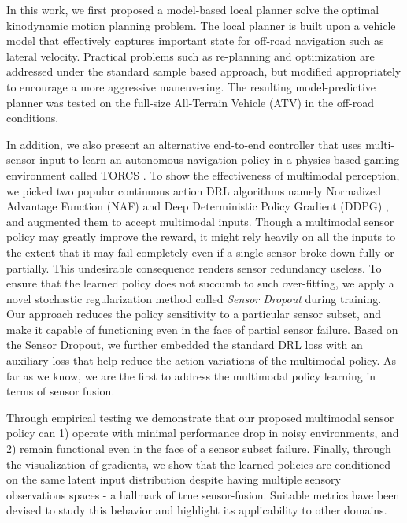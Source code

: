 \documentclass[../thesis.tex]{subfiles}
\begin{document}
In this work, we first proposed a model-based local planner solve the optimal kinodynamic motion planning problem. 
The local planner is built upon a vehicle model that effectively captures important state for off-road navigation such as lateral velocity. 
Practical problems such as re-planning and optimization are addressed under the standard sample based approach, but modified appropriately to encourage a more aggressive maneuvering. 
The resulting model-predictive planner was tested on the full-size All-Terrain Vehicle (ATV) in the off-road conditions.

In addition, we also present an alternative end-to-end controller that uses multi-sensor input to learn an autonomous navigation policy in a physics-based gaming environment called TORCS \cite{wymann2000torcs}. 
To show the effectiveness of multimodal perception, we picked two popular continuous action DRL algorithms namely Normalized Advantage Function (NAF) \cite{CDQN} and Deep Deterministic Policy Gradient (DDPG) \cite{DBLP:journals/corr/LillicrapHPHETS15}, and augmented them to accept multimodal inputs. 
Though a multimodal sensor policy may greatly improve the reward, it might rely heavily on all the inputs to the extent that it may fail completely even if a single sensor broke down fully or partially. This undesirable consequence renders sensor redundancy useless. 
To ensure that the learned policy does not succumb to such over-fitting, we apply a novel stochastic regularization method called \emph{Sensor Dropout} during training. 
Our approach reduces the policy sensitivity to a particular sensor subset, and make it capable of functioning even in the face of partial sensor failure. 
Based on the Sensor Dropout, we further embedded the standard DRL loss with an auxiliary loss that help reduce the action variations of the multimodal policy. 
As far as we know, we are the first to address the multimodal policy learning in terms of sensor fusion.

Through empirical testing we demonstrate that our proposed multimodal sensor policy can 1) operate with minimal performance drop in noisy environments, and 2) remain functional even in the face of a sensor subset failure. 
Finally, through the visualization of gradients, we show that the learned policies are conditioned on the same latent input distribution despite having multiple sensory observations spaces - a hallmark of true sensor-fusion.
Suitable metrics have been devised to study this behavior and highlight its applicability to other domains.
\end{document}
